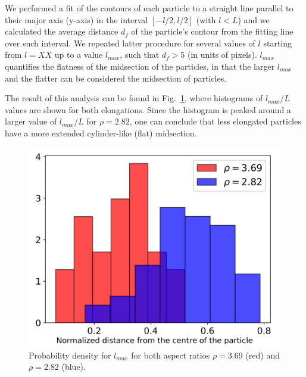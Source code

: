\documentclass[aip,graphicx]{revtex4-1} %
\begin{document}
We performed a fit of the contours of each particle to a straight line parallel to their major axis (y-axis)
in the interval $[-l/2, l/2]$ (with $l < L$) and we calculated the average distance $d_f$ of
the particle's contour from the fitting line over such interval. 
We repeated latter procedure for several values of $l$ starting from $l=XX$ up to a value $l_{max}$, such that
$d_f > 5$ (in units of pixels). $l_{max}$ quantifies the flatness of the midsection of the particles, in that 
the larger $l_{max}$ and the flatter can be considered the midsection of particles.

The result of this analysis can be found in Fig.~\ref{fig:maxlength_div}, where histograms of $l_{max}/L$ values are shown
for both elongations. Since the histogram is peaked around a larger value of $l_{max}/L$ for $\rho=2.82$, one can conclude
that less elongated particles have a more extended cylinder-like (flat) midsection. 

\begin{figure}
    \centering
    \includegraphics[width=0.5\columnwidth]{maxlength_div.png}
    \caption{Probability density for $l_{max}$ for both aspect ratios $\rho=3.69$ (red) and $\rho=2.82$ (blue).}\label{fig:maxlength_div}
\end{figure}


\end{document}
